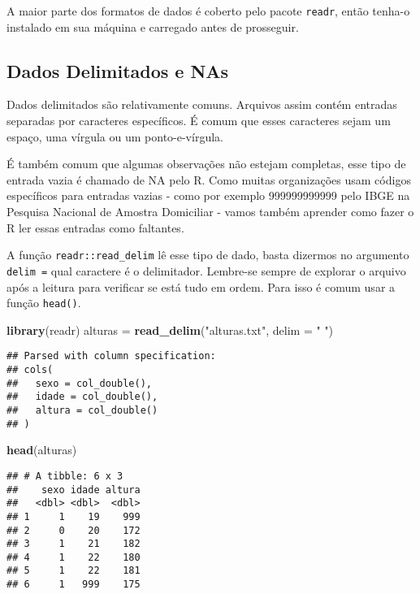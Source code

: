 \documentclass[]{article}
\newenvironment{Shaded}{\begin{snugshade}}{\end{snugshade}}
\newcommand{\KeywordTok}[1]{\textcolor[rgb]{0.13,0.29,0.53}{\textbf{#1}}}
\newcommand{\DataTypeTok}[1]{\textcolor[rgb]{0.13,0.29,0.53}{#1}}
\newcommand{\StringTok}[1]{\textcolor[rgb]{0.31,0.60,0.02}{#1}}
\newcommand{\NormalTok}[1]{#1}
\begin{document}
A maior parte dos formatos de dados é coberto pelo pacote
\texttt{readr}, então tenha-o instalado em sua máquina e carregado antes
de prosseguir.

\subsection{Dados Delimitados e NAs}\label{dados-delimitados-e-nas}

Dados delimitados são relativamente comuns. Arquivos assim contém
entradas separadas por caracteres específicos. É comum que esses
caracteres sejam um espaço, uma vírgula ou um ponto-e-vírgula.

É também comum que algumas observações não estejam completas, esse tipo
de entrada vazia é chamado de NA pelo R. Como muitas organizações usam
códigos específicos para entradas vazias - como por exemplo 999999999999
pelo IBGE na Pesquisa Nacional de Amostra Domiciliar - vamos também
aprender como fazer o R ler essas entradas como faltantes.

A função \texttt{readr::read\_delim} lê esse tipo de dado, basta
dizermos no argumento \texttt{delim\ =} qual caractere é o delimitador.
Lembre-se sempre de explorar o arquivo após a leitura para verificar se
está tudo em ordem. Para isso é comum usar a função \texttt{head()}.

\begin{Shaded}
\begin{Highlighting}[]
\KeywordTok{library}\NormalTok{(readr)}
\NormalTok{alturas =}\StringTok{ }\KeywordTok{read_delim}\NormalTok{(}\StringTok{"alturas.txt"}\NormalTok{, }
                     \DataTypeTok{delim =} \StringTok{" "}\NormalTok{)}
\end{Highlighting}
\end{Shaded}

\begin{verbatim}
## Parsed with column specification:
## cols(
##   sexo = col_double(),
##   idade = col_double(),
##   altura = col_double()
## )
\end{verbatim}

\begin{Shaded}
\begin{Highlighting}[]
\KeywordTok{head}\NormalTok{(alturas)}
\end{Highlighting}
\end{Shaded}

\begin{verbatim}
## # A tibble: 6 x 3
##    sexo idade altura
##   <dbl> <dbl>  <dbl>
## 1     1    19    999
## 2     0    20    172
## 3     1    21    182
## 4     1    22    180
## 5     1    22    181
## 6     1   999    175
\end{verbatim}
\end{document}
